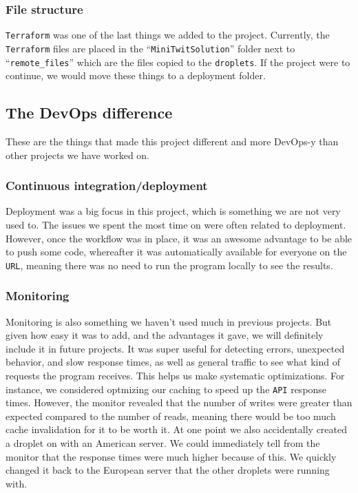 \subsubsection{File structure}

\texttt{Terraform} was one of the last things we added to the project.
Currently, the \texttt{Terraform} files are placed in the ``\texttt{MiniTwitSolution}'' 
folder next to ``\texttt{remote\_files}'' which are the files copied to the \texttt{droplets}.
If the project were to continue, we would move these things to a deployment folder.

\subsection{The DevOps difference}

These are the things that made this project different and more DevOps-y
than other projects we have worked on.

\subsubsection{Continuous integration/deployment}

Deployment was a big focus in this project, 
which is something we are not very used to.
The issues we spent the most time on were often related to deployment.
However, once the workflow was in place, it was
an awesome advantage to be able to push some code,
whereafter it was automatically available for everyone on the \texttt{URL}, 
meaning there was no need to run the program locally to see the results.

\subsubsection{Monitoring}

Monitoring is also something we haven't used much in previous projects.
But given how easy it was to add, and the advantages it gave,
we will definitely include it in future projects.
It was super useful for detecting errors, unexpected behavior,
and slow response times, as well as general traffic to see 
what kind of requests the program receives.
This helps us make systematic optimizations. For instance,
we considered optmizing our caching to speed up the \texttt{API} response times.
However, the monitor revealed that the number of writes were
greater than expected compared to the number of reads,
meaning there would be too much cache invalidation for it to be worth it.
At one point we also accidentally created a droplet on with an American server.
We could immediately tell from the monitor that the response 
times were much higher because of this.
We quickly changed it back to the European server 
that the other droplets were running with.

